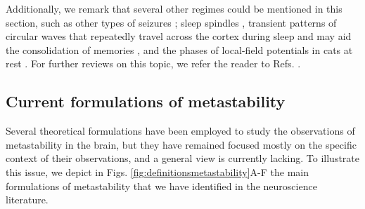 Additionally, we remark that several other regimes could be mentioned in this section, such as other types of seizures \cite{curtis2015initiation, babloyantz1986low}; sleep spindles \cite{fernandez2020sleep}, transient patterns of circular waves that repeatedly travel across the cortex during sleep and may aid the consolidation of memories \cite{muller2016rotating}, and the phases of local-field potentials in cats at rest \cite{tognoli2014metastable, popa2009constracting}. For further reviews on this topic, we refer the reader to Refs. \cite{tognoli2014metastable, brinkman2022metastable, cavanna2018dynamic, tsuda2009hypotheses}.


\subsection{Current formulations of metastability}\label{sec:currentformulations}

Several theoretical formulations have been employed to study the observations of metastability in the brain, but they have remained focused mostly on the specific context of their observations, and a general view is currently lacking. To illustrate this issue, we depict in Figs. \ref{fig:definitionsmetastability}A-F the main formulations of metastability that we have identified in the neuroscience literature.

